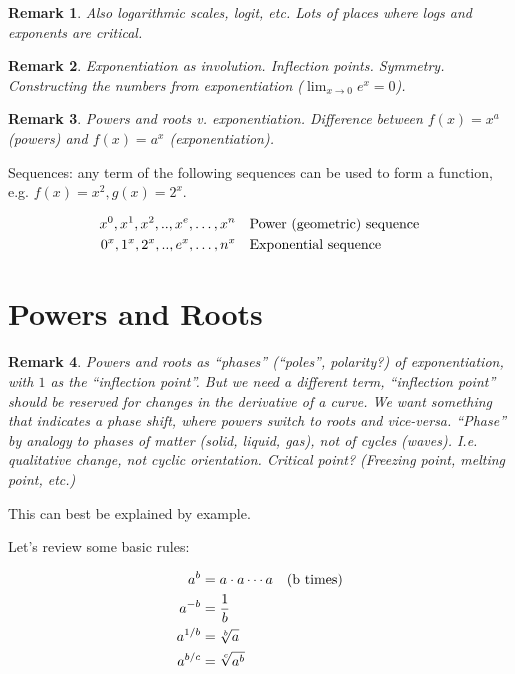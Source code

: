\documentclass[reqno,12pt]{tufte-book}
\numberwithin{equation}{subsection}
\newtheorem{remark}{Remark}
\begin{document}
\begin{remark}
  Also logarithmic scales, logit, etc.  Lots of places where logs and
  exponents are critical.
\end{remark}

\begin{remark}
  Exponentiation as involution.  Inflection points.  Symmetry.
  Constructing the numbers from exponentiation ($\lim_{x \to 0}e^x =
  0$).
\end{remark}

\begin{remark}
  Powers and roots v. exponentiation.  Difference between ${f(x) =
    x^a}$ (powers) and ${f(x)= a^x}$ (exponentiation).
\end{remark}

Sequences: any term of the following sequences can be used to form a
function, e.g. $f(x) = x^2, g(x) = 2^x$.

{
  \begin{alignat}{2}
    x^0, x^1, x^2,..,x^e,\ldots,x^n & \quad \textnormal{Power (geometric) sequence} \\
    0^x, 1^x, 2^x,..,e^x,\ldots,n^x & \quad \textnormal{Exponential sequence}
  \end{alignat}
}

\section{Powers and Roots}

\begin{remark}
  Powers and roots as ``phases'' (``poles'', polarity?) of
  exponentiation, with $1$ as the ``inflection point''.  But we need a
  different term, ``inflection point'' should be reserved for changes
  in the derivative of a curve.  We want something that indicates a
  phase shift, where powers switch to roots and vice-versa.  ``Phase''
  by analogy to phases of matter (solid, liquid, gas), not of cycles
  (waves).  I.e. qualitative change, not cyclic orientation.  Critical
  point? (Freezing point, melting point, etc.)
\end{remark}

This can best be explained by example.

Let's review some basic rules:

{
  \begin{alignat}{2}
    a^{b} &= a\cdot a\cdots a \quad \textnormal{(b times)} \\
    a^{-b} &= \frac{1}{b} \\
    a^{1/b} &= \sqrt[b]{a} \\
    a^{b/c} &= \sqrt[c]{a^b}
  \end{alignat}
}
\end{document}

